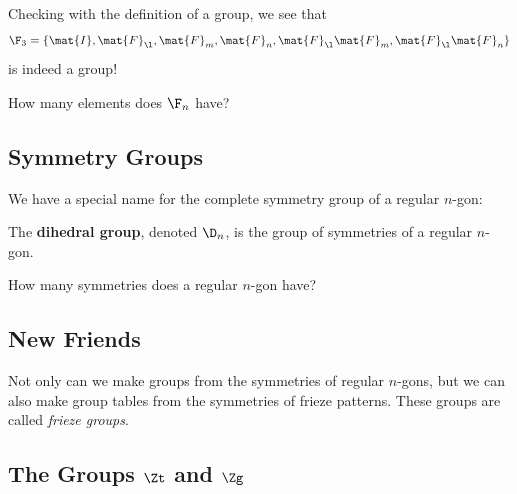 Checking with the definition of a group, we see that 
\[
\F_3 = \{ \mat{I}, \mat{F}_\l, \mat{F}_m, \mat{F}_n, \mat{F}_\l\mat{F}_m,\mat{F}_\l\mat{F}_n\}
\]
is indeed a group!

\begin{ques}
How many elements does $\F_n$ have?
\end{ques}
\QM



\subsection*{Symmetry Groups}

We have a special name for the complete symmetry group of a regular
$n$-gon:

\begin{dfn} The \textbf{dihedral group}, denoted $\D_n$, is the group of symmetries of a regular
  $n$-gon.
\end{dfn}

\begin{ques}
How many symmetries does a regular $n$-gon have?
\end{ques}
\QM




\subsection{New Friends}


Not only can we make groups from the symmetries of regular $n$-gons,
but we can also make group tables from the symmetries of frieze
patterns. These groups are called \textit{frieze groups}.


\subsection*{The Groups $\boldsymbol{\Zt}$ and $\boldsymbol{\Zg}$}

